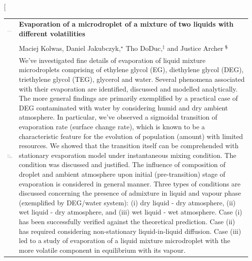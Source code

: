 \documentclass[twoside,twocolumn,9pt]{article}
\begin{document}
\twocolumn[
  \begin{@twocolumnfalse}
\vspace{3cm}
\sffamily
\begin{tabular}{m{4.5cm} p{13.5cm} }

\includegraphics{head_foot/DOI} & \noindent
\LARGE{\textbf{Evaporation of a microdroplet of a mixture of two liquids with different volatilities}}\\
\vspace{0.3cm} & \vspace{0.3cm} \\

 & \noindent\large{Maciej Kolwas, Daniel Jakubczyk,$^{\star}$ Tho DoDuc,$^{\ddag}$ and Justice Archer$\: ^{\mbox{\footnotesize \textsection}}$} \\

\includegraphics{head_foot/dates} & \noindent\normalsize{We've investigated fine details of evaporation of liquid mixture microdroplets comprising of ethylene glycol (EG), diethylene glycol (DEG), triethylene glycol (TEG), glycerol and water. Several phenomena associated with their evaporation are identified, discussed and modelled analytically. The more general findings are primarily exemplified by a practical case of DEG contaminated with water by considering humid and dry ambient atmosphere. In particular, we've observed a sigmoidal transition of evaporation rate (surface change rate), which is known to be a characteristic feature for the evolution of population (amount) with limited resources. We showed that the transition itself can be comprehended with stationary evaporation model under instantaneous mixing condition. The condition was discussed and justified. The influence of composition of droplet and ambient atmosphere upon initial (pre-transition) stage of evaporation is considered in general manner. Three types of conditions are discussed concerning the presence of admixture in liquid and vapour phase (exemplified by DEG/water system): (i) dry liquid - dry atmosphere, (ii) wet liquid - dry atmosphere, and (iii) wet liquid - wet atmosphere. Case (i) has been successfully verified against the theoretical prediction. Case (ii) has required considering non-stationary liquid-in-liquid diffusion. Case (iii) led to a study of evaporation of a liquid mixture microdroplet with the more volatile component in equilibrium with its vapour.} \\


\end{tabular}
\end{@twocolumnfalse}
\end{document}
